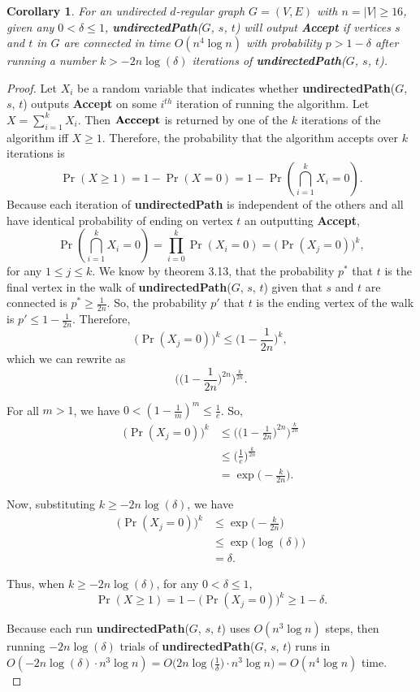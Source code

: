 \documentclass[psamsfonts, 10pt]{amsart}
\newtheorem{cor}[thm]{Corollary}
\theoremstyle{definition}
\theoremstyle{remark}
\numberwithin{equation}{section}
\begin{document}
\begin{cor}
For an undirected $d$-regular graph $G = (V, E)$ with $n = \lvert V \rvert \geq 16$, given any $0 < \delta \leq 1$, {\bf undirectedPath}($G$, $s$, $t$) will output {\bf Accept} if vertices $s$ and $t$ in $G$ are connected in time $O(n^4 \log{n})$ with probability $p > 1 - \delta$ after running a number $k > -2n\log(\delta)$ iterations of {\bf undirectedPath}($G$, $s$, $t$). 
\end{cor}
\begin{proof}
Let $X_i$ be a random variable that indicates whether {\bf undirectedPath}($G$, $s$, $t$) outputs {\bf Accept} on some $i^{th}$ iteration of running the algorithm. Let $X = \sum_{i = 1}^{k} X_i$. Then ${\bf Acccept}$ is returned by one of the $k$ iterations of the algorithm iff $X \geq 1$. Therefore, the probability that the algorithm accepts over $k$ iterations is
\[
\Pr(X \geq 1)  = 1 - \Pr(X  = 0) = 1 - \Pr\left(\bigcap_{i=1}^k X_i = 0 \right).
\]
Because each iteration of {\bf undirectedPath} is independent of the others and all have identical probability of ending on vertex $t$ an outputting {\bf Accept},
\[
\Pr\left(\bigcap_{i=1}^k X_i = 0 \right) = \prod_{i  = 0}^k \Pr(X_i = 0) = \Big(\Pr(X_j = 0)\Big)^k,
\]
for any $1 \leq j \leq k$. We know by theorem 3.13, that the probability $p^*$ that $t$ is the final vertex in the walk of {\bf undirectedPath}($G$, $s$, $t$) given that $s$ and $t$ are connected is $p^* \geq \frac{1}{2n}$. So, the probability $p'$ that $t$ is the ending vertex of the walk is $p' \leq 1- \frac{1}{2n}$. Therefore,
\[
\Big(\Pr(X_j = 0)\Big)^k \leq \Big(1- \frac{1}{2n}\Big)^k,
\]
which we can rewrite as
\[
\Bigg( \bigg( 1 - \frac{1}{2n}\bigg)^{2n}\Bigg)^\frac{k}{2n}.
\]

For all  $m > 1$,  we have $0 < (1 - \frac{1}{m})^m \leq \frac{1}{e}$. So, 
\begin{equation}\begin{aligned}
\Big(\Pr(X_j = 0)\Big)^k &\leq \Bigg( \bigg( 1 - \frac{1}{2n}\bigg)^{2n}\Bigg)^\frac{k}{2n}\\
& \leq \bigg( \frac{1}{e}\bigg)^{\frac{k}{2n}}\\
&= \exp\bigg(-\frac{k}{2n}\bigg).
\end{aligned}
\end{equation}

Now, substituting $k \geq -2n\log(\delta)$, we have
\[\begin{aligned}
\Big(\Pr(X_j = 0)\Big)^k &\leq  \exp\bigg(-\frac{k}{2n}\bigg)\\
&\leq \exp\Big(\log(\delta)\Big)\\
& = \delta.
\end{aligned}
\]

Thus, when $k \geq -2n\log(\delta)$, for any $0 < \delta \leq 1$,
\[
\Pr(X \geq 1)  = 1 - \Big(\Pr(X_j = 0)\Big)^k \geq 1 - \delta.
\]

Because each run {\bf undirectedPath}($G$, $s$, $t$) uses $O(n^3 \log{n})$ steps, then running $-2n\log(\delta)$ trials of {\bf undirectedPath}($G$, $s$, $t$) runs in $O(-2n\log(\delta) \cdot n^3 \log{n}) = O\Big(2n\log\Big(\frac{1}{\delta}\Big) \cdot n^3 \log{n}\Big) = O(n^4 \log{n})$ time.
\\
\end{proof}
\end{document}
